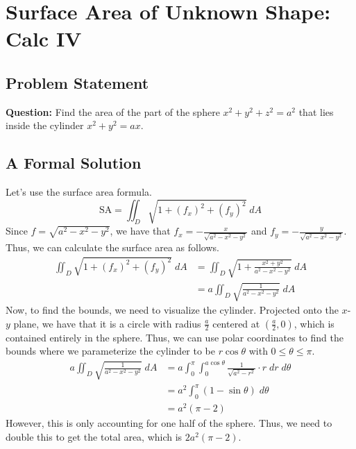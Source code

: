 
\section{Surface Area of Unknown Shape: Calc IV}
\subsection{Problem Statement}
    \textbf{Question:} Find the area of the part of the sphere $x^2+y^2+z^2=a^2$ that lies inside the cylinder $x^2+y^2=a x$.
\subsection{A Formal Solution}
Let's use the surface area formula.
$$
\text{SA} = \iint_D \sqrt{1 + (f_x)^2 + (f_y)^2} \;dA
$$
Since $f = \sqrt{a^2 - x^2 - y^2}$, we have that $f_x = -\frac{x}{\sqrt{a^2 - x^2 - y^2}}$ and $f_y = -\frac{y}{\sqrt{a^2 - x^2 - y^2}}$. Thus, we can calculate the surface area as follows.
\begin{align*}
    \iint_D  \sqrt{1 + (f_x)^2 + (f_y)^2} \;dA &= \iint_D \sqrt{1 + \frac{x^2 + y^2}{a^2 - x^2 - y^2}} \;dA \\
    &= a \iint_D \sqrt{\frac{1}{a^2 - x^2 - y^2}}\;dA
\end{align*}
Now, to find the bounds, we need to visualize the cylinder. Projected onto the $x$-$y$ plane, we have that it is a circle with radius $\frac{a}{2}$ centered at $\left(\frac{a}{2},0\right)$, which is contained entirely in the sphere. Thus, we can use polar coordinates to find the bounds where we parameterize the cylinder to be $r\cos \theta$ with $0 \leq \theta \leq \pi$. 
\begin{align*}
    a \iint_D \sqrt{\frac{1}{a^2 - x^2 - y^2}}\;dA &= a \int_{0}^{\pi} \int_{0}^{a\cos \theta} \frac{1}{\sqrt{a^2 - r^2}} \cdot r \;dr \;d\theta \\
    &= a^2 \int_{0}^{\pi} \left(1 - \sin \theta\right) \;d\theta \\
    &= a^2(\pi - 2)
\end{align*}
However, this is only accounting for one half of the sphere. Thus, we need to double this to get the total area, which is $\boxed{2a^2(\pi - 2)}$.
